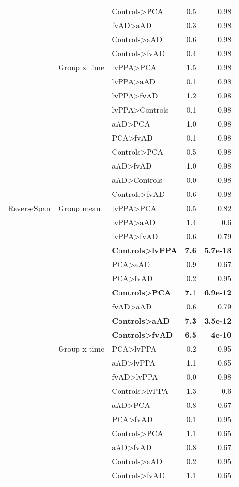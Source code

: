 \documentclass[]{article}
\begin{document}
\begin{table}[ht]
{\begin{tabular}{lllrr}
   &  & Controls>PCA & 0.5 & 0.98 \\ 
   &  & fvAD>aAD & 0.3 & 0.98 \\ 
   &  & Controls>aAD & 0.6 & 0.98 \\ 
   &  & Controls>fvAD & 0.4 & 0.98 \\ 
   & Group x time & lvPPA>PCA & 1.5 & 0.98 \\ 
   &  & lvPPA>aAD & 0.1 & 0.98 \\ 
   &  & lvPPA>fvAD & 1.2 & 0.98 \\ 
   &  & lvPPA>Controls & 0.1 & 0.98 \\ 
   &  & aAD>PCA & 1.0 & 0.98 \\ 
   &  & PCA>fvAD & 0.1 & 0.98 \\ 
   &  & Controls>PCA & 0.5 & 0.98 \\ 
   &  & aAD>fvAD & 1.0 & 0.98 \\ 
   &  & aAD>Controls & 0.0 & 0.98 \\ 
   &  & Controls>fvAD & 0.6 & 0.98 \\ 
  ReverseSpan & Group mean & lvPPA>PCA & 0.5 & 0.82 \\ 
   &  & lvPPA>aAD & 1.4 & 0.6 \\ 
   &  & lvPPA>fvAD & 0.6 & 0.79 \\ 
   &  & \textbf{Controls>lvPPA} & \textbf{7.6} & \textbf{5.7e-13} \\ 
   &  & PCA>aAD & 0.9 & 0.67 \\ 
   &  & PCA>fvAD & 0.2 & 0.95 \\ 
   &  & \textbf{Controls>PCA} & \textbf{7.1} & \textbf{6.9e-12} \\ 
   &  & fvAD>aAD & 0.6 & 0.79 \\ 
   &  & \textbf{Controls>aAD} & \textbf{7.3} & \textbf{3.5e-12} \\ 
   &  & \textbf{Controls>fvAD} & \textbf{6.5} & \textbf{4e-10} \\ 
   & Group x time & PCA>lvPPA & 0.2 & 0.95 \\ 
   &  & aAD>lvPPA & 1.1 & 0.65 \\ 
   &  & fvAD>lvPPA & 0.0 & 0.98 \\ 
   &  & Controls>lvPPA & 1.3 & 0.6 \\ 
   &  & aAD>PCA & 0.8 & 0.67 \\ 
   &  & PCA>fvAD & 0.1 & 0.95 \\ 
   &  & Controls>PCA & 1.1 & 0.65 \\ 
   &  & aAD>fvAD & 0.8 & 0.67 \\ 
   &  & Controls>aAD & 0.2 & 0.95 \\ 
   &  & Controls>fvAD & 1.1 & 0.65 \\ 
   \hline
\end{tabular}
}
\end{table}
\end{document}

